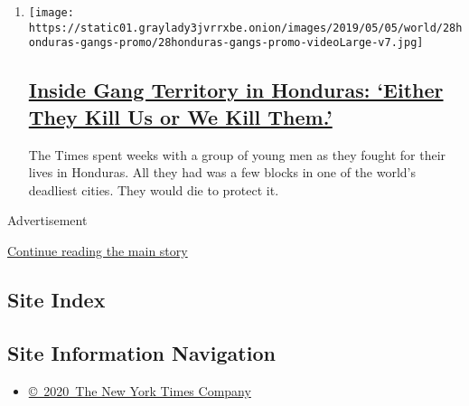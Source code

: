 \begin{enumerate}
\def\labelenumi{\arabic{enumi}.}
\item
  \texttt{[image: https://static01.graylady3jvrrxbe.onion/images/2019/05/05/world/28honduras-gangs-promo/28honduras-gangs-promo-videoLarge-v7.jpg]}

  \hypertarget{inside-gang-territory-in-honduras-either-they-kill-us-or-we-kill-them}{%
  \subsection{\texorpdfstring{\href{/interactive/2019/05/04/world/americas/honduras-gang-violence.html}{Inside
  Gang Territory in Honduras: `Either They Kill Us or We Kill
  Them.'}}{Inside Gang Territory in Honduras: `Either They Kill Us or We Kill Them.'}}\label{inside-gang-territory-in-honduras-either-they-kill-us-or-we-kill-them}}

  The Times spent weeks with a group of young men as they fought for
  their lives in Honduras. All they had was a few blocks in one of the
  world's deadliest cities. They would die to protect it.
\end{enumerate}

Advertisement

\protect\hyperlink{after-mid1}{Continue reading the main story}

\hypertarget{site-index}{%
\subsection{Site Index}\label{site-index}}

\hypertarget{site-information-navigation}{%
\subsection{Site Information
Navigation}\label{site-information-navigation}}

\begin{itemize}
\tightlist
\item
  \href{https://help.nytimes3xbfgragh.onion/hc/en-us/articles/115014792127-Copyright-notice}{©~2020~The
  New York Times Company}
\end{itemize}

